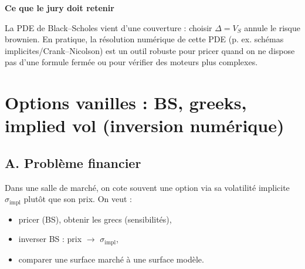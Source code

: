 \documentclass[11pt,a4paper]{report}
\theoremstyle{definition}
\newtheorem{example}{Exemple}[chapter]
\theoremstyle{plain}
\theoremstyle{remark}
\newcommand{\1}{\mathbf{1}}
\newcommand{\filepath}[1]{\texttt{\detokenize{#1}}}
\newcommand{\codeid}[1]{\texttt{\detokenize{#1}}}
\newenvironment{jurybox}{
\par\medskip
\begin{lrbox}{\juryboxbox}
\begin{minipage}{0.97\textwidth}
\textbf{Ce que le jury doit retenir}\par\smallskip
\ignorespaces
}{
\unskip\end{minipage}
\end{lrbox}
\noindent\fcolorbox{black!30}{black!3}{\usebox{\juryboxbox}}
\par\medskip
}
\begin{document}

\begin{jurybox}
La PDE de Black--Scholes vient d'une couverture : choisir $\Delta=V_S$ annule le risque brownien. En pratique, la résolution numérique de cette PDE (p. ex. schémas implicites/Crank--Nicolson) est un outil robuste pour pricer quand on ne dispose pas d'une formule fermée ou pour vérifier des moteurs plus complexes.
\end{jurybox}

\chapter{Options vanilles : BS, greeks, implied vol (inversion numérique)}

\section{A. Problème financier}
Dans une salle de marché, on cote souvent une option via sa volatilité implicite $\sigma_{\text{impl}}$ plutôt que son prix. On veut :
\begin{itemize}[leftmargin=*]
\item pricer (BS), obtenir les grecs (sensibilités),
\item inverser BS : prix $\to$ $\sigma_{\text{impl}}$,
\item comparer une surface marché à une surface modèle.
\end{itemize}
\end{document}
